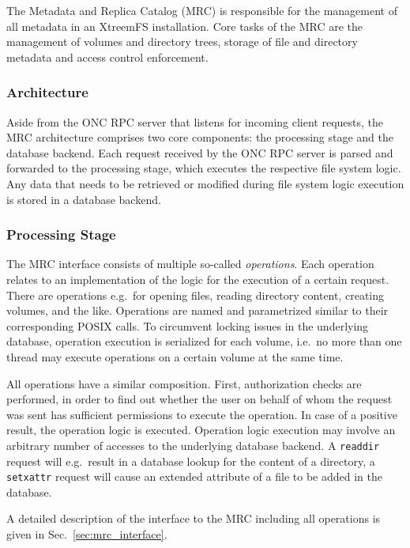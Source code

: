The Metadata and Replica Catalog (MRC) is responsible for the management of all metadata in an XtreemFS installation. Core tasks of the MRC are the management of volumes and directory trees, storage of file and directory metadata and access control enforcement.

\subsubsection {Architecture}

Aside from the ONC RPC server that listens for incoming client requests, the MRC architecture comprises two core components: the processing stage and the database backend. Each request received by the ONC RPC server is parsed and forwarded to the processing stage, which executes the respective file system logic. Any data that needs to be retrieved or modified during file system logic execution is stored in a database backend.

\subsubsection{Processing Stage}

The MRC interface consists of multiple so-called \emph{operations}. Each operation relates to an implementation of the logic for the execution of a certain request. There are operations e.g.\ for opening files, reading directory content, creating volumes, and the like. Operations are named and parametrized similar to their corresponding POSIX calls. To circumvent locking issues in the underlying database, operation execution is serialized for each volume, i.e.\ no more than one thread may execute operations on a certain volume at the same time.

All operations have a similar composition. First, authorization checks are performed, in order to find out whether the user on behalf of whom the request was sent has sufficient permissions to execute the operation. In case of a positive result, the operation logic is executed. Operation logic execution may involve an arbitrary number of accesses to the underlying database backend. A \texttt{readdir} request will e.g.\ result in a database lookup for the content of a directory, a \texttt{setxattr} request will cause an extended attribute of a file to be added in the database.

A detailed description of the interface to the MRC including all operations is given in Sec.\ \ref{sec:mrc_interface}.

